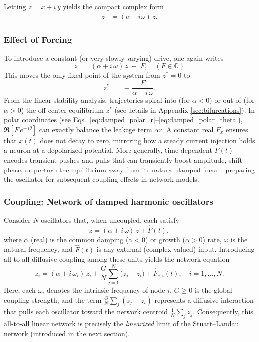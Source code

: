 \documentclass[11pt]{article}
\numberwithin{equation}{section}
\begin{document}
Letting \( z = x + i\,y \) yields the compact complex form
\begin{align}
    \dot{z} &= (\alpha + i\omega)\,z. \label{eq:damped_complex}
\end{align}


\subsubsection{Effect of Forcing}
 To introduce a constant (or very slowly varying) drive, one again writes
\begin{equation}
    \dot z \;=\; (\alpha + i\,\omega)\,z \;+\; F, \quad  (F\in\mathbb{C})
\end{equation}
This moves the only fixed point of the system from \(z^*=0\) to 
\begin{equation}
    z^{*} \;=\; -\,\frac{F}{\alpha + i\,\omega}.
\end{equation}
From the linear stability analysis, trajectories spiral into (for \(\alpha < 0\)) or out of (for \(\alpha>0\)) the off‐center equilibrium \(z^{*}\) (see details in Appendix \ref{sec:bifurcations}).  In polar coordinates (see Eqs.~\eqref{eq:damped_polar_r}–\eqref{eq:damped_polar_theta}), \(\Re[F\,e^{-\,i\theta}]\) can exactly balance the leakage term \(\alpha r\). A constant real \(F_x\) ensures that \(x(t)\) does not decay to zero, mirroring how a steady current injection holds a neuron at a depolarized potential.  More generally, time‐dependent \(F(t)\) encodes transient pushes and pulls that can transiently boost amplitude, shift phase, or perturb the equilibrium away from its natural damped focus—preparing the oscillator for subsequent coupling effects in network models.

 
 
\subsubsection{Coupling: Network of  damped harmonic oscillators}

Consider \(N\) oscillators that, when uncoupled, each satisfy  
\[
    \dot{z} = (\alpha + i\,\omega)\,z + \hat F(t),
\]
where \(\alpha\) (real) is the common damping (\(\alpha<0\)) or growth (\(\alpha>0\)) rate, \(\omega\) is the natural frequency, and \(\hat F(t)\) is any external (complex‐valued) input.  Introducing all‐to‐all diffusive coupling among these units yields the network equation  
\begin{equation}
    \dot{z}_{i} 
    = (\alpha + i\,\omega_{i})\,z_{i} 
    + \frac{G}{N}\sum_{j=1}^{N}\bigl(z_{j} - z_{i}\bigr) 
    +  \hat F_{e;i}(t),
    \quad
    i = 1,\dots, N.
    \label{eq:coupled_linear_damped_complex}
\end{equation}
Here, each \(\omega_{i}\) denotes the intrinsic frequency of node \(i\), \(G\ge0\) is the global coupling strength, and the term \(\tfrac{G}{N}\sum_{j}(z_{j} - z_{i})\) represents a diffusive interaction that pulls each oscillator toward the network centroid \(\tfrac{1}{N}\sum_{j}z_{j}\).    Consequently, this all‐to‐all linear network is precisely the \emph{linearized} limit of the Stuart–Landau network (introduced in the next section).
\end{document}
